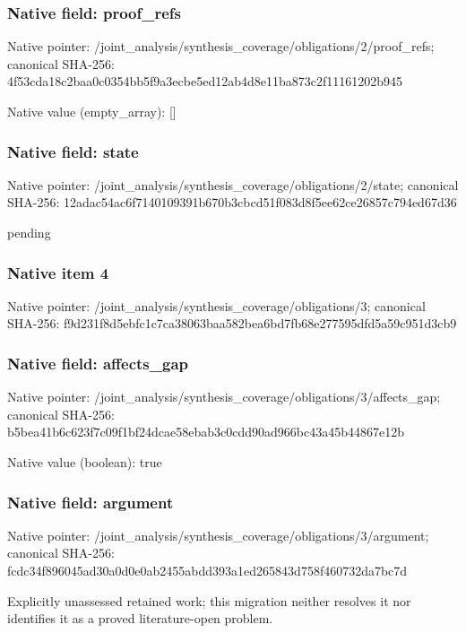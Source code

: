 \documentclass[10pt,a4paper]{article}
\begin{document}
\subsubsection{Native field: proof\_\allowbreak{}refs}
Native pointer: /joint\_\allowbreak{}analysis/synthesis\_\allowbreak{}coverage/obligations/2/proof\_\allowbreak{}refs; canonical SHA-256: 4f53cda18c2baa0c0354bb5f9a3ecbe5ed12ab4d8e11ba873c2f11161202b945

Native value (empty\_\allowbreak{}array): []

\subsubsection{Native field: state}
Native pointer: /joint\_\allowbreak{}analysis/synthesis\_\allowbreak{}coverage/obligations/2/state; canonical SHA-256: 12adac54ac6f7140109391b670b3cbcd51f083d8f5ee62ce26857c794ed67d36

\begingroup\raggedright\sloppy pending\par\endgroup

\subsubsection{Native item 4}
Native pointer: /joint\_\allowbreak{}analysis/synthesis\_\allowbreak{}coverage/obligations/3; canonical SHA-256: f9d231f8d5ebfc1c7ca38063baa582bea6bd7fb68e277595dfd5a59c951d3cb9

\subsubsection{Native field: affects\_\allowbreak{}gap}
Native pointer: /joint\_\allowbreak{}analysis/synthesis\_\allowbreak{}coverage/obligations/3/affects\_\allowbreak{}gap; canonical SHA-256: b5bea41b6c623f7c09f1bf24dcae58ebab3c0cdd90ad966bc43a45b44867e12b

Native value (boolean): true

\subsubsection{Native field: argument}
Native pointer: /joint\_\allowbreak{}analysis/synthesis\_\allowbreak{}coverage/obligations/3/argument; canonical SHA-256: fcdc34f896045ad30a0d0e0ab2455abdd393a1ed265843d758f460732da7bc7d

\begingroup\raggedright\sloppy Explicitly unassessed retained work;\allowbreak{} this migration neither resolves it nor identifies it as a proved literature-open problem.\par\endgroup
\end{document}
